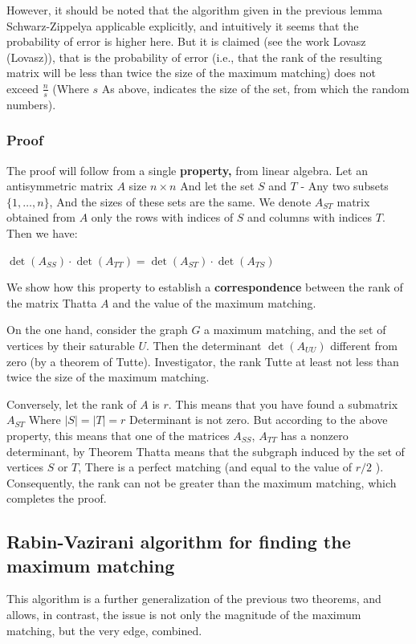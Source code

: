 However, it should be noted that the algorithm given in the previous lemma Schwarz-Zippelya applicable explicitly, and intuitively it seems that the probability of error is higher here. But it is claimed (see the work Lovasz (Lovasz)), that is the probability of error (i.e., that the rank of the resulting matrix will be less than twice the size of the maximum matching) does not exceed $\frac {n} {s}$ (Where $s$ As above, indicates the size of the set, from which the random numbers).

\subsubsection{ Proof }

The proof will follow from a single \textbf{property,} from linear algebra. Let an antisymmetric matrix $A$ size $n \times n$ And let the set $S$ and $T$ - Any two subsets $\{1, \ldots, n \}$, And the sizes of these sets are the same. We denote $A_ {ST}$ matrix obtained from $A$ only the rows with indices of $S$ and columns with indices $T$. Then we have:

$\det(A_{SS})\cdot\det(A_{TT})=\det(A_{ST})\cdot\det(A_{TS})$

We show how this property to establish a \textbf{correspondence} between the rank of the matrix Thatta $A$ and the value of the maximum matching.

On the one hand, consider the graph $G$ a maximum matching, and the set of vertices by their saturable $U$. Then the determinant $\det (A_ {UU})$ different from zero (by a theorem of Tutte). Investigator, the rank Tutte at least not less than twice the size of the maximum matching.

Conversely, let the rank of $A$ is $r$. This means that you have found a submatrix $A_ {ST}$ Where $| S | = | T | = r$ Determinant is not zero. But according to the above property, this means that one of the matrices $A_ {SS}$, $A_ {TT}$ has a nonzero determinant, by Theorem Thatta means that the subgraph induced by the set of vertices $S$ or $T$, There is a perfect matching (and equal to the value of $r / 2$ ). Consequently, the rank can not be greater than the maximum matching, which completes the proof.

\subsection{ Rabin-Vazirani algorithm for finding the maximum matching }

This algorithm is a further generalization of the previous two theorems, and allows, in contrast, the issue is not only the magnitude of the maximum matching, but the very edge, combined.

